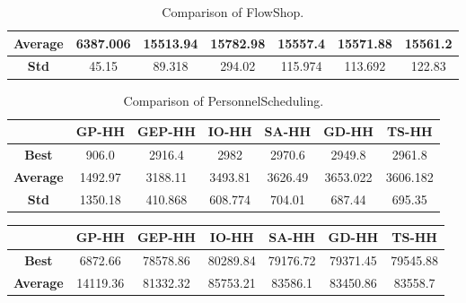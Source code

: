 \documentclass[a4paper,12pt]{article}
\begin{document}
{\begin{table}[ht]
\begin{tabular}{| c | c | c | c | c| c| c|}
                    \hline
                    \textbf{Average} & 6387.006 & 15513.94& 15782.98& 15557.4& 15571.88& 15561.2\\
                    \hline
                    \textbf{Std} & 45.15 & 89.318& 294.02& 115.974& 113.692& 122.83\\
                    \hline
                \end{tabular}
                \caption{Comparison of FlowShop.} 
        \end{table}
        \begin{table}[ht] 
                \small 
                \centering
                \begin{tabular}{| c | c | c | c | c| c| c|} 
                    \hline   
                    &\textbf{GP-HH} & \textbf{GEP-HH} & \textbf{IO-HH} & \textbf{SA-HH} & \textbf{GD-HH} & \textbf{TS-HH} \\
                    \hline
                    \textbf{Best} & 906.0 & 2916.4& 2982& 2970.6& 2949.8&2961.8\\
                    \hline
                    \textbf{Average} & 1492.97 & 3188.11& 3493.81& 3626.49& 3653.022&3606.182\\
                    \hline
                    \textbf{Std} & 1350.18 & 410.868& 608.774& 704.01& 687.44& 695.35\\
                    \hline
                \end{tabular}
                \caption{Comparison of PersonnelScheduling.} 
        \end{table}
        \begin{table}[ht] 
                \small 
                \centering
                \begin{tabular}{| c | c | c | c | c| c| c|} 
                    \hline   
                    &\textbf{GP-HH} & \textbf{GEP-HH} & \textbf{IO-HH} & \textbf{SA-HH} & \textbf{GD-HH} & \textbf{TS-HH} \\
                    \hline
                    \textbf{Best} & 6872.66 & 78578.86& 80289.84& 79176.72& 79371.45& 79545.88\\
                    \hline
                    \textbf{Average} & 14119.36 & 81332.32& 85753.21& 83586.1& 83450.86& 83558.7\\

\end{tabular}
\end{table}}
\end{document}
